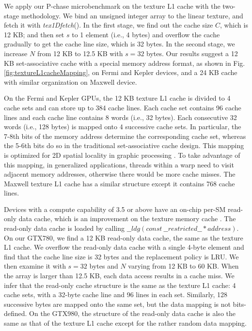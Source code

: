 \documentclass[10pt,journal,compsoc]{IEEEtran}
\theoremstyle{definition}
\begin{document}
We apply our P-chase microbenchmark on the texture L1 cache with the two-stage methodology. We bind an unsigned integer array to the linear texture, and fetch it with \emph{tex1Dfetch}(). In the first stage, we find out the cache size $C$, which is 12 KB; and then set $s$ to 1 element (i.e., 4 bytes) and overflow the cache gradually to get the cache line size, which is 32 bytes. In the second stage, we increase $N$ from 12 KB to 12.5 KB with $s=32$ bytes. Our results suggest a 12 KB set-associative cache with a special memory address format, as shown in Fig. \ref{fig:textureL1cacheMapping}, on Fermi and Kepler devices, and a 24 KB cache with similar organization on Maxwell device.

On the Fermi and Kepler GPUs, the 12 KB texture L1 cache is divided to 4 cache sets and can store up to 384 cache lines. Each cache set contains 96 cache lines and each cache line contains 8 words (i.e., 32 bytes). Each consecutive 32 words (i.e., 128 bytes) is mapped onto 4 successive cache sets. In particular, the 7-8th bits of the memory address determine the corresponding cache set, whereas the 5-6th bits do so in the traditional set-associative cache design. This mapping is optimized for 2D spatial locality in graphic processing \cite{cudabestguide,hakura1997design}. To take advantage of this mapping, in generalized applications, threads within a warp need to visit adjacent memory addresses, otherwise there would be more cache misses. The Maxwell texture L1 cache has a similar structure except it contains 768 cache lines.



Devices with a compute capability of 3.5 or above have an on-chip per-SM read-only data cache, which is an improvement on the texture memory cache \cite{keplerwhitepaper}. The read-only data cache is loaded by calling $\_\_ldg(const\ \_\_restricted\_\_ * address)$. On our GTX780, we find a 12 KB read-only data cache, the same as the texture L1 cache. We overflow the read-only data cache with a single 4-byte element and find that the cache line size is 32 bytes and the replacement policy is LRU. We then examine it with $s=32$ bytes and $N$ varying from 12 KB to 60 KB. When the array is larger than 12.5 KB, each data access results in a cache miss. We infer that the read-only cache structure is the same as the texture L1 cache: 4 cache sets, with a 32-byte cache line and 96 lines in each set. Similarly, 128 successive bytes are mapped onto the same set, but the data mapping is not bits-defined. On the GTX980, the structure of the read-only data cache is also the same as that of the texture L1 cache except for the rather random data mapping.
\end{document}
